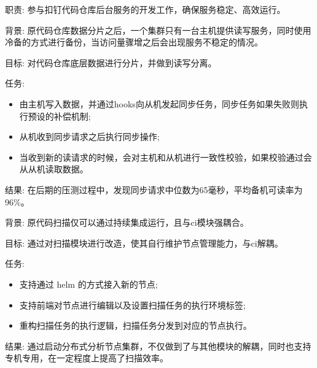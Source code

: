 \documentclass{resume}
\begin{document}
\begin{onehalfspacing}
职责: 参与扣钉代码仓库后台服务的开发工作，确保服务稳定、高效运行。

背景: 原代码仓库数据分片之后，一个集群只有一台主机提供读写服务，同时使用冷备的方式进行备份，当访问量骤增之后会出现服务不稳定的情况。

目标: 对代码仓库底层数据进行分片，并做到读写分离。

任务: 
\begin{itemize}
  \item 由主机写入数据，并通过hooks向从机发起同步任务，同步任务如果失败则执行预设的补偿机制;
  \item 从机收到同步请求之后执行同步操作;
  \item 当收到新的读请求的时候，会对主机和从机进行一致性校验，如果校验通过会从从机读取数据。
\end{itemize}

结果: 在后期的压测过程中，发现同步请求中位数为65毫秒，平均备机可读率为96\%。
\end{onehalfspacing}

\begin{onehalfspacing}

背景: 原代码扫描仅可以通过持续集成运行，且与ci模块强耦合。

目标: 通过对扫描模块进行改造，使其自行维护节点管理能力，与ci解耦。

任务: 
\begin{itemize}
  \item 支持通过 helm 的方式接入新的节点;
  \item 支持前端对节点进行编辑以及设置扫描任务的执行环境标签;
  \item 重构扫描任务的执行逻辑，扫描任务分发到对应的节点执行。
\end{itemize}

结果: 通过启动分布式分析节点集群，不仅做到了与其他模块的解耦，同时也支持专机专用，在一定程度上提高了扫描效率。
\end{onehalfspacing}
\end{document}
